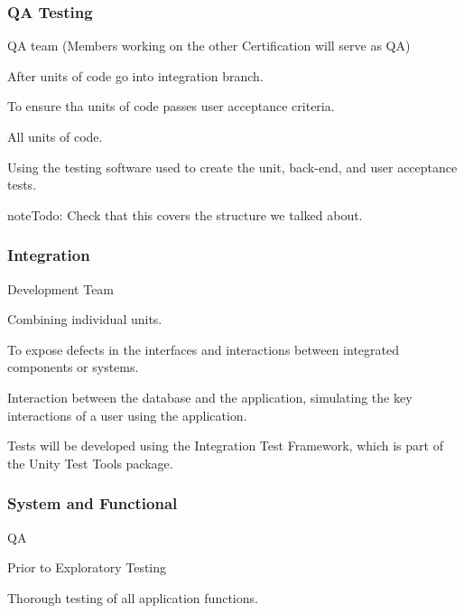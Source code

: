 \documentclass[letterpaper,10pt,english]{sphinxmanual}
\begin{document}
\subsubsection{QA Testing}
\label{\detokenize{test_plan/strategy:qa-testing}}
 QA team (Members working on the other Certification will serve as QA)

 After units of code go into integration branch.

 To ensure tha units of code passes user acceptance criteria.

 All units of code.

 Using the testing software used to create the unit, back-end, and user acceptance tests.

\begin{sphinxadmonition}{note}{\label{test_plan/strategy:index-1}Todo:}
Check that this covers the structure we talked about.
\end{sphinxadmonition}


\subsubsection{Integration}
\label{\detokenize{test_plan/strategy:integration}}
 Development Team

 Combining individual units.

 To expose defects in the interfaces and interactions between integrated components or systems.

 Interaction between the database and the application, simulating the key interactions of a user using the application.

 Tests will be developed using the Integration Test Framework, which is part of the Unity Test Tools package.


\subsubsection{System and Functional}
\label{\detokenize{test_plan/strategy:system-and-functional}}
 QA

 Prior to Exploratory Testing

 Thorough testing of all application functions.
\end{document}
